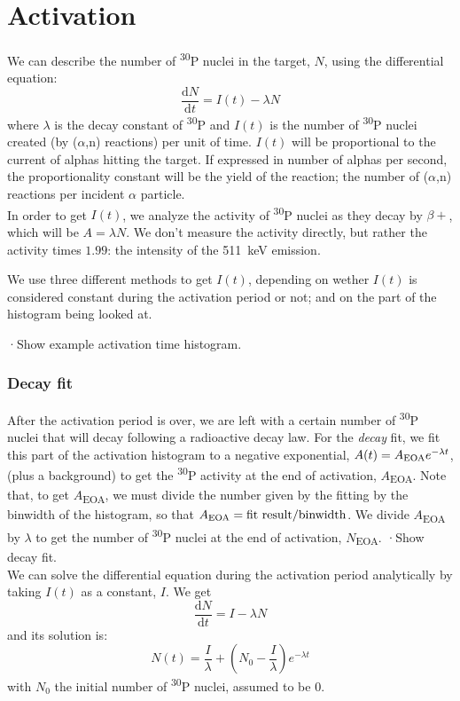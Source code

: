 \documentclass[a4paper,12pt]{report}
\newcommand{\dif}{\text{d}}
\newcommand{\ddt}[1]{\frac{\dif #1}{\dif t}}
\newcommand{\an}{($\alpha$,n) }
\newcommand{\Piso}{\textsuperscript{30}P }
\begin{document}
\section{Activation}
We can describe the number of \Piso nuclei in the target, $N$, using the differential equation:
\begin{equation}
	\ddt{N} = I(t) -\lambda N
	\label{activation_diffeq}
\end{equation}
where $\lambda$ is the decay constant of \Piso and $I(t)$ is the number of \Piso nuclei created (by \an reactions) per unit of time.
$I(t)$ will be proportional to the current of alphas hitting the target.
If expressed in number of alphas per second, the proportionality constant will be the yield of the reaction; the number of \an reactions per incident $\alpha$ particle.\\

In order to get $I(t)$, we analyze the activity of \Piso nuclei as they decay by $\beta +$, which will be $A = \lambda N$.
We don't measure the activity directly, but rather the activity times $1.99$: the intensity of the \qty{511}{\keV} emission.	%

We use three different methods to get $I(t)$, depending on wether $I(t)$ is considered constant during the activation period or not; and on the part of the histogram being looked at.

·Show example activation time histogram.\\

\subsubsection{Decay fit}
After the activation period is over, we are left with a certain number of \Piso nuclei that will decay following a radioactive decay law.
For the \textit{decay} fit, we fit this part of the activation histogram to a negative exponential, $A(t) = A\textsubscript{EOA} e^{-\lambda t}$, (plus a background) to get the \Piso activity at the end of activation, $A$\textsubscript{EOA}.
Note that, to get $A$\textsubscript{EOA}, we must divide the number given by the fitting by the binwidth of the histogram, so that $A\textsubscript{EOA}=\text{fit result}/\text{binwidth}$.
We divide $A$\textsubscript{EOA} by $\lambda$ to get the number of \Piso nuclei at the end of activation, $N$\textsubscript{EOA}.
·Show decay fit.\\

We can solve the differential equation during the activation period analytically by taking $I(t)$ as a constant, $I$.
We get
\[ \ddt{N} = I -\lambda N  \]
and its solution is:
\begin{equation}
	N(t) = \frac{I}{\lambda} + \left(  N_0 - \frac{I}{\lambda}  \right) e^{-\lambda t}
\end{equation}
with $N_0$ the initial number of \Piso nuclei, assumed to be \num{0}.
\end{document}
